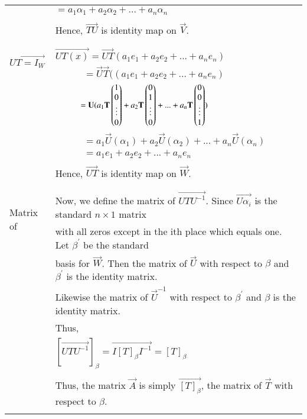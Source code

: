 \documentclass[journal,12pt,twocolumn]{IEEEtran}
\begin{document}
\begin{table}[hp]
\begin{tabular}{|l|l|}
		& \qquad \quad $= a_1\alpha_{1} + a_2\alpha_{2} + ... + a_n\alpha_{n}$\\
		& \\
		& Hence, $\vec{TU}$ is identity map on $\vec{V}$.\\
		& \\
		\hline	
		\multirow{3}{*}{$\vec{UT=I_W}$} & \\
		& $\vec{UT(x)}  = \vec{UT}(a_1e_1 + a_2e_2 + ... + a_ne_n)$ \qquad \qquad \qquad \qquad \qquad \qquad \qquad \qquad \qquad \qquad \\
		& $ \qquad \quad = \vec{U}\vec{T}((a_1e_1 + a_2e_2 + ... + a_ne_n)$ \\
		& $ \qquad \quad = \mathbf{U}(a_1\mathbf{T}\begin{pmatrix}1 \\ 0 \\ \vdots \\ 0 \end{pmatrix} + a_2\mathbf{T}\begin{pmatrix}0 \\ 1 \\ \vdots \\ 0 \end{pmatrix} + ... + a_n\mathbf{T}\begin{pmatrix}0 \\ 0 \\ \vdots \\ 1 \end{pmatrix}) $\\
		& $ \qquad \quad = a_1\vec{U}(\alpha_{1}) + a_2\vec{U}(\alpha_{2}) + ... + a_n\vec{U}(\alpha_{n})$ \\
		& $ \qquad \quad = a_1e_1 + a_2e_2 + ... + a_ne_n$ \\
		&\\
		& Hence, $\vec{UT}$ is identity map on $\vec{W}$. \\
		& \\
		\hline	
		\multirow{3}{*}{Matrix of} & \\
		& Now, we define the matrix of $\vec{UTU^{-1}}$. Since $\vec{U\alpha_{i}}$ is the standard $n \times 1$ matrix  \quad \\
		\quad	$\vec{UTU^{-1}}$ & with all zeros except in the ith place which equals one. Let $\beta^{'}$ be the standard \\
		& basis for $\vec{W}$. Then the matrix of $\vec{U}$ with respect to $\beta$ and $\beta^{'}$ is the      identity matrix. \\
		& Likewise the matrix of $\vec{U}^{-1}$ with respect to $\beta^{'}$ and $\beta$ is the identity matrix. \\
		& Thus,\\
		& \qquad \qquad \qquad $[\vec{UTU^{-1}}]_\beta = \vec{I[T]_\beta I^{-1}} = [T]_\beta$\\
		& \\
		& Thus, the matrix $\vec{A}$ is simply $\vec{[T]_\beta}$, the matrix of $\vec{T}$ with respect to $\beta$.\\
		& \\
		\hline			
	\end{tabular}
\end{table}
\pagebreak
\end{document}
